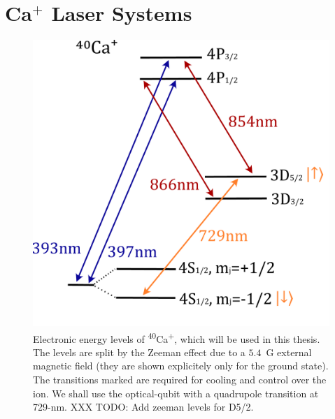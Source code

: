 \section{Ca$^+$ Laser Systems}	
\label{sec:Laser systems}
    \begin{figure}[ht]
        \begin{center}
        \noindent\includegraphics[width=0.4\linewidth]{figures/pdf_figure/Ca40.pdf}
        \end{center}
        \caption{
        Electronic energy levels of \textsuperscript{40}Ca\textsuperscript{+},
        which will be used in this thesis. The levels are
        split by the Zeeman effect due to a $5.4$~G external magnetic field (they are shown explicitely only for the ground state). The
        transitions marked are required for cooling and control over the
        ion. We shall use the optical-qubit with a quadrupole transition at
        729-nm. XXX TODO: Add zeeman levels for D5/2.
        }

    \label{fig:ion}
    \end{figure}

